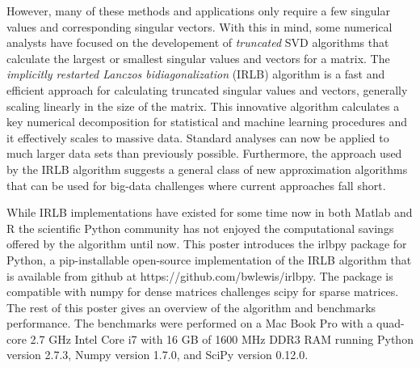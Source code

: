 \documentclass[landscape,a0b,final]{a0poster}
\newenvironment{poster}{
  \begin{center}
  \begin{minipage}[c]{0.98\textwidth}
}{
  \end{minipage} 
  \end{center}
}
\newcommand{\pbox}[4]{
\psshadowbox[#3]{
\begin{minipage}[t][#2][t]{#1}
#4
\end{minipage}
}}
\begin{document}
\begin{poster}
\begin{multicols}{3}
\vspace{0.75cm}

However, many of these methods and applications only require a few singular
values and corresponding singular vectors. With this in mind, some 
numerical analysts
have focused on the developement of {\em truncated} SVD algorithms that
calculate the largest or smallest singular values and vectors for a matrix.
The {\em implicitly restarted Lanczos bidiagonalization} (IRLB) algorithm
\cite{Baglama2006} is a fast and efficient approach
for calculating truncated singular values and vectors, generally scaling 
linearly in the size of the matrix. This innovative algorithm 
calculates a key numerical decomposition for statistical and machine 
learning procedures and it effectively scales to massive data.
Standard analyses can now be applied to
much larger data sets than previously possible.
Furthermore, the approach used by the IRLB algorithm suggests a general class
of new approximation algorithms that can be used for big-data challenges
where current approaches fall short.

\vspace{0.75cm}

While IRLB implementations have existed for some time now in both 
Matlab \cite{irlbaMatlab} and R \cite{irlbaR} the scientific Python community
has not enjoyed the computational savings offered by the algorithm until now.
This poster introduces the irlbpy package for Python, a pip-installable 
open-source implementation of the IRLB algorithm that is available from
github at https://github.com/bwlewis/irlbpy. The package is compatible with
numpy for dense matrices challenges scipy for sparse matrices. The rest
of this poster gives an overview of the algorithm and benchmarks performance.
The benchmarks were performed on a Mac Book Pro with a quad-core
2.7 GHz Intel Core i7 with 16 GB of 1600 MHz DDR3 RAM running Python 
version 2.7.3, Numpy version 1.7.0, and SciPy version 0.12.0.

\columnbreak

\vspace{2cm}\begin{center}\pbox{0.8\columnwidth}{}{linewidth=2mm,framearc=0.1,fillstyle=gradient,gradangle=0,gradbegin=white,gradend=white,gradmidpoint=1.0,framesep=1em}{\begin{center}\bf{Partial SVD Definition}\end{center}}\end{center}\vspace{1.25cm}


\end{multicols}
\end{poster}
\end{document}
